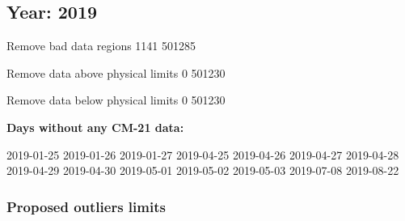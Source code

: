 \documentclass[
  10pt,
  a4paper,oneside]{article}
\begin{document}
\FloatBarrier

\newpage

\hypertarget{year-2019}{%
\subsection{Year: 2019}\label{year-2019}}

Remove bad data regions
1141 501285

Remove data above physical limits
0 501230

Remove data below physical limits
0 501230

\textbf{Days without any CM-21 data:}

2019-01-25 2019-01-26 2019-01-27 2019-04-25 2019-04-26 2019-04-27 2019-04-28 2019-04-29 2019-04-30 2019-05-01 2019-05-02 2019-05-03 2019-07-08 2019-08-22

\hypertarget{proposed-outliers-limits-26}{%
\subsubsection{Proposed outliers limits}\label{proposed-outliers-limits-26}}

\footnotesize
\end{document}
